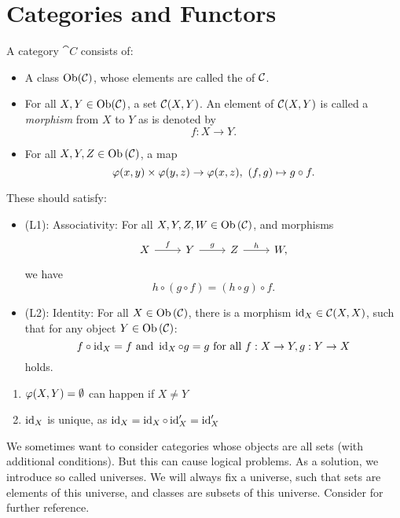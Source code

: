 \chapter{Categories and Functors}
\begin{defn}
  A category $\cat{C}$ consists of:
  \begin{itemize}
    \item A class $\text{Ob}(\mathcal{C})$, whose elements are called the  of $\mathcal{C}$.
    \item For all $X,Y\in \text{Ob}(\mathcal{C}) $, a set $\mathcal{C}(X,Y)$. An element of $\mathcal{C}(X,Y)$ is called a \emph{morphism}  from $X$ to $Y$ as is denoted by
    \[
    f:X\to Y.
    \]
    \item For all $X,Y,Z\in \text{Ob}\left(\mathcal{C}\right)$, a map
    \[
    \varphi(x,y)\times \varphi(y,z)\to \varphi(x,z),~(f,g)\mapsto g\circ f.
    \]
  \end{itemize}
  These should satisfy:
  \begin{itemize}
    \item (L1): Associativity: For all $X,Y,Z,W\in \text{Ob}\left(\mathcal{C}\right)$, and morphisms
    \[
    \begin{tikzcd}
      X\ar{r}{f}&Y\ar{r}{g}&Z\ar{r}{h}&W,
    \end{tikzcd}
    \]
    we have
    \[
    h\circ(g\circ f)=(h\circ g)\circ f .
    \]
    \item (L2): Identity: For all $X\in \text{Ob}\left(\mathcal{C}\right)$, there is a morphism $\operatorname{id}_X\in \mathcal{C}(X,X)$, such that for any object $Y\in \text{Ob}\left(\mathcal{C}\right)$:
    \[
    f\circ \operatorname{id}_X=f\text{ and }\operatorname{id}_X\circ g=g\text{ for all }f:X\to Y,g:Y\to X
    \]
    holds.
  \end{itemize}
  \end{defn}

  \begin{rem}
    \begin{enumerate}
      \item $\varphi(X,Y)=\emptyset$ can happen if $X\neq Y$
      \item $\operatorname{id}_X$ is unique, as $\operatorname{id}_X=\operatorname{id}_X\circ \operatorname{id}_{X}'=\operatorname{id}_X'$
    \end{enumerate}
  \end{rem}
  \begin{rem}
    We sometimes want to consider categories whose objects are all sets (with additional conditions). But this can cause logical problems. As a solution, we introduce so called universes. We will always fix a universe, such that sets are elements of this universe, and classes are subsets of this universe. Consider \cite[1.6]{catwork} for further reference.
  \end{rem}
  \lec
